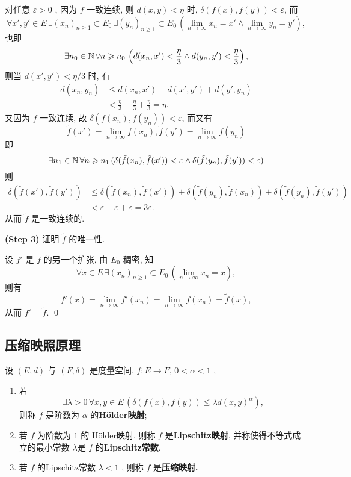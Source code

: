 \begin{Proof}
	对任意 $ \varepsilon>0 $ , 因为 $ f $ 一致连续, 则 $ d(x, y)<\eta $ 时, $ \delta(f(x), f(y))<\varepsilon $, 而
	\[
		\forall x', y'\in E\,\exists  (x_{n})_{n\geqslant1}\subset E_{0} \,\exists  (y_{n})_{n\geqslant1}\subset E_{0} \,(\lim_{n\to\infty}x_{n}=x'\land \lim_{n\to\infty}y_{n}=y' ),
	\]
	也即
	\[
		\exists n_{0}\in\mathbb{N}\,\forall n\geqslant n_{0}\,\left(d(x_{n}, x')<\frac{\eta}{3}\land d(y_{n}, y')<\frac{\eta}{3}\right),
	\]
	则当 $ d(x', y')<\eta/3 $ 时, 有
	\[
		\begin{aligned}
			d(x_{n}, y_{n}) & \leqslant d(x_{n}, x')+d(x', y')+d(y', y_{n})        \\
			                & < \frac{\eta}{3}+\frac{\eta}{3}+\frac{\eta}{3}=\eta.
		\end{aligned}
	\]
	又因为 $ f $ 一致连续, 故 $ \delta(f(x_{n}), f(y_{n}))<\varepsilon $, 而又有
	\[
		\tilde{f}(x')=\lim_{n\to\infty}f(x_{n}), \tilde{f}(y')=\lim_{n\to\infty}f(y_{n})
	\]
	即
	\[
		\exists n_{1}\in\mathbb{N}\,\forall n\geqslant n_{1}\,(\delta(\tilde{f}(x_{n}), \tilde{f}(x'))<\varepsilon\land \delta(\tilde{f}(y_{n}), \tilde{f}(y'))<\varepsilon)
	\]
	则
	\[
		\begin{aligned}
			\delta(\tilde{f}(x'), \tilde{f}(y')) & \leqslant \delta(\tilde{f}(x_{n}), \tilde{f}(x'))+\delta(\tilde{f}(y_{n}), \tilde{f}(x_{n}))+\delta(\tilde{f}(y_{n}), \tilde{f}(y')) \\
			                                     & <\varepsilon+\varepsilon+\varepsilon=3\varepsilon.
		\end{aligned}
	\]
	从而 $ \tilde{f} $ 是一致连续的.

	\textbf{(Step 3)} 证明 $ \tilde{f} $ 的唯一性.


	设 $ {f}' $ 是 $ f $ 的另一个扩张, 由 $ E_{0} $ 稠密, 知
	\[
		\forall x\in E\,\exists (x_{n})_{n\geqslant1} \subset E_{0}\,(\lim_{n\to\infty}x_{n}=x),
	\]
	则有
	\[
		f'(x)=\lim_{n\to\infty}f'(x_{n})=\lim_{n\to\infty}f(x_{n})=\tilde{f}(x),
	\]
	从而 $ f'=\tilde{f} $. \qed
\end{Proof}

\subsection{压缩映照原理}

\begin{Definition}[H\"older映射]\label{def:H\"older映射}
	设 $ (E, d) $ 与 $ (F, \delta) $ 是度量空间,  $ f:E\to F $, $ 0<\alpha<1 $ ,
	\begin{enumerate}[(1)]
		\item 若
		      \[
			      \exists \lambda>0\,\forall x, y\in E\,(\delta(f(x), f(y))\leqslant\lambda d(x, y)^{\alpha}),
		      \]
		      则称 $ f $ 是阶数为 $ \alpha $ 的\textbf{H\"older映射};
		\item 若 $ f $ 为阶数为 $ 1 $ 的 H\"older映射, 则称 $ f $ 是\textbf{Lipschitz映射}, 并称使得不等式成立的最小常数 $ \lambda $是 $ f $ 的\textbf{Lipschitz常数}.
		\item 若 $ f $ 的Lipschitz常数 $ \lambda<1 $ , 则称 $ f $ 是\textbf{压缩映射.}
	\end{enumerate}
\end{Definition}

